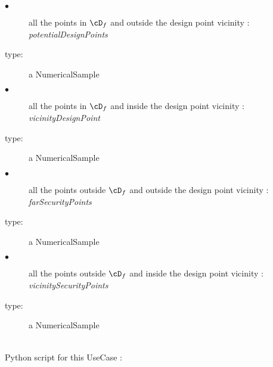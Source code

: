              {
               \begin{description}
               \item[$\bullet$] all the points in $\cD_f$ and outside the design point vicinity : {\em potentialDesignPoints}
               \item[type:] a NumericalSample
               \item[$\bullet$] all the points in $\cD_f$ and inside the design point vicinity : {\em vicinityDesignPoint}
               \item[type:] a NumericalSample
               \item[$\bullet$] all the points outside $\cD_f$ and outside the design point vicinity : {\em farSecurityPoints}
               \item[type:] a NumericalSample
               \item[$\bullet$] all the points outside $\cD_f$ and inside the design point vicinity : {\em vicinitySecurityPoints}
               \item[type:] a NumericalSample
               \end{description}
             }

             \textspace\\

             Python script for this UseCase :

